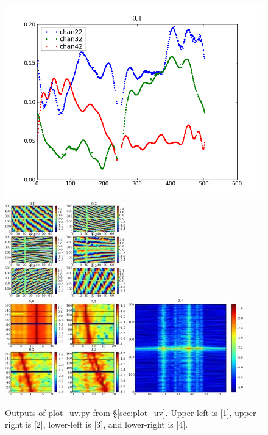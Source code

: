 \begin{figure}
\begin{center}
\includegraphics[scale=.38]{plot_uv1.png}
\includegraphics{plot_uv2.jpg}\\
\includegraphics{plot_uv3.jpg}
\includegraphics{plot_uv4.jpg}\\
\caption{Outputs of plot\_uv.py from \S\ref{sec:plot_uv}. Upper-left is [1],
upper-right is [2], lower-left is [3], and lower-right is [4].}
\label{fig:plot_uv}
\end{center}
\end{figure}

